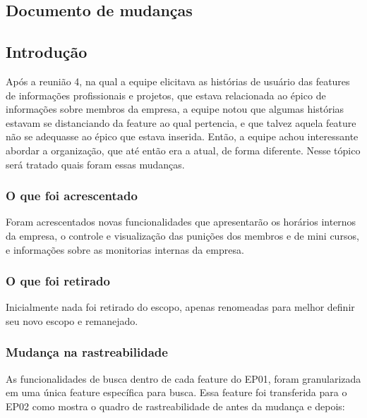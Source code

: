 \begin{anexosenv}
\chapter[Documento de mudanças]{Documento de mudanças}\label{docMudanca}

\section[Intodução]{Introdução}

Após a reunião 4, na qual a equipe elicitava as histórias de usuário das features de informações profissionais e projetos, que estava relacionada ao épico de informações sobre membros da empresa, a equipe notou que algumas histórias estavam se distanciando da feature ao qual pertencia, e que talvez aquela feature não se adequasse ao épico que estava inserida. Então, a equipe achou interessante abordar a organização, que até então era a atual, de forma diferente. Nesse tópico será tratado quais foram essas mudanças.\\

\subsection[O que foi acrescentado]{O que foi acrescentado}

Foram acrescentados novas funcionalidades que apresentarão os horários internos da empresa, o controle e visualização das punições dos membros e de mini cursos, e  informações sobre as monitorias internas da empresa.\\

\subsection[O que foi retirado]{O que foi retirado}

Inicialmente nada foi retirado do escopo, apenas renomeadas para melhor definir seu novo escopo e remanejado.\\

\subsection[Mudança na rastreabilidade]{Mudança na rastreabilidade}

As funcionalidades de busca dentro de cada feature do EP01, foram granularizada em uma única feature específica para busca. Essa feature foi transferida para o EP02 como mostra o quadro de rastreabilidade de antes da mudança e depois: \\


\end{anexosenv}
